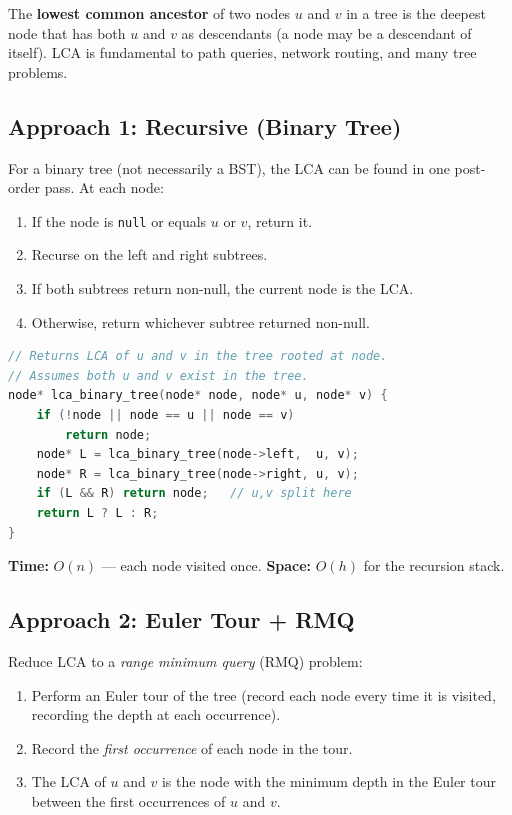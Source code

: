 The \textbf{lowest common ancestor} of two nodes $u$ and $v$ in a tree
is the deepest node that has both $u$ and $v$ as descendants (a node
may be a descendant of itself).  LCA is fundamental to path queries,
network routing, and many tree problems.

\subsection{Approach 1: Recursive (Binary Tree)}

For a binary tree (not necessarily a BST), the LCA can be found in
one post-order pass.  At each node:

\begin{enumerate}
\item If the node is \texttt{null} or equals $u$ or $v$, return it.
\item Recurse on the left and right subtrees.
\item If both subtrees return non-null, the current node is the LCA.
\item Otherwise, return whichever subtree returned non-null.
\end{enumerate}

\begin{lstlisting}[language=C++]
// Returns LCA of u and v in the tree rooted at node.
// Assumes both u and v exist in the tree.
node* lca_binary_tree(node* node, node* u, node* v) {
    if (!node || node == u || node == v)
        return node;
    node* L = lca_binary_tree(node->left,  u, v);
    node* R = lca_binary_tree(node->right, u, v);
    if (L && R) return node;   // u,v split here
    return L ? L : R;
}
\end{lstlisting}

\textbf{Time:} $O(n)$ --- each node visited once.
\textbf{Space:} $O(h)$ for the recursion stack.

\subsection{Approach 2: Euler Tour + RMQ}

Reduce LCA to a \emph{range minimum query} (RMQ) problem:

\begin{enumerate}
\item Perform an Euler tour of the tree (record each node every time
      it is visited, recording the depth at each occurrence).
\item Record the \emph{first occurrence} of each node in the tour.
\item The LCA of $u$ and $v$ is the node with the minimum depth in
      the Euler tour between the first occurrences of $u$ and $v$.
\end{enumerate}

